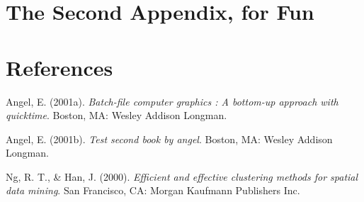\documentclass[12pt,twoside]{amherstthesis}
\begin{document}
  \begin{Shaded}
  \begin{Highlighting}[]
  \NormalTok{(}\OperatorTok{!}
    \NormalTok{(}\NormalTok{, } \NormalTok{)}
  \NormalTok{(}\OperatorTok{!}
      \NormalTok{(}\NormalTok{, } \NormalTok{)}
  \NormalTok{(}\OperatorTok{!}
      \NormalTok{(}\NormalTok{, } \NormalTok{)}
  \NormalTok{(}\OperatorTok{!}
  \OperatorTok{::}\NormalTok{(}\NormalTok{)}
  \NormalTok{\}}
  \end{Highlighting}
  \end{Shaded}
  
  \chapter{The Second Appendix, for
  Fun}\label{the-second-appendix-for-fun}
  
  \backmatter
  
  \chapter{References}\label{references}
  
  \noindent
  
  \setlength{\parindent}{-0.20in} \setlength{\leftskip}{0.20in}
  \setlength{\parskip}{8pt}
  
  \hypertarget{refs}{}
  \hypertarget{ref-angel2001}{}
  Angel, E. (2001a). \emph{Batch-file computer graphics : A bottom-up
  approach with quicktime}. Boston, MA: Wesley Addison Longman.
  
  \hypertarget{ref-angel2002a}{}
  Angel, E. (2001b). \emph{Test second book by angel}. Boston, MA: Wesley
  Addison Longman.
  
  \hypertarget{ref-ng1994}{}
  Ng, R. T., \& Han, J. (2000). \emph{Efficient and effective clustering
  methods for spatial data mining}. San Francisco, CA: Morgan Kaufmann
  Publishers Inc.


\end{document}
